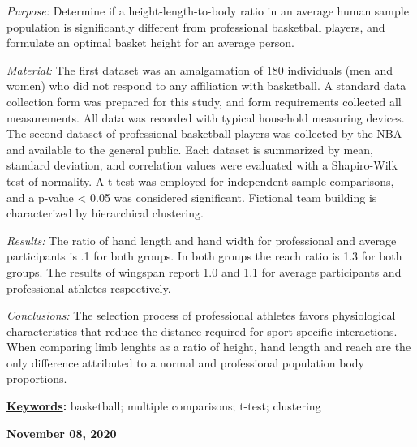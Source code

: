 \documentclass[]{article}
\renewenvironment{abstract}
 {{%
    \setlength{\leftmargin}{0mm}
    \setlength{\rightmargin}{\leftmargin}%
  }%
  \relax}
 {\endlist}
\begin{document}
\begin{abstract}

    \hbox{\vrule height .2pt width 39.14pc}

    \vskip 8.5pt %

\noindent \noindent \emph{Purpose:} Determine if a height-length-to-body ratio in
an average human sample population is significantly different from
professional basketball players, and formulate an optimal basket height
for an average person.\vspace{0.25in}

\noindent \emph{Material:} The first dataset was an amalgamation of 180
individuals (men and women) who did not respond to any affiliation with
basketball. A standard data collection form was prepared for this study,
and form requirements collected all measurements. All data was recorded
with typical household measuring devices. The second dataset of
professional basketball players was collected by the NBA and available
to the general public. Each dataset is summarized by mean, standard
deviation, and correlation values were evaluated with a Shapiro-Wilk
test of normality. A t-test was employed for independent sample
comparisons, and a p-value \textless{} 0.05 was considered significant.
Fictional team building is characterized by hierarchical clustering.
\vspace{0.25in}

\noindent \emph{Results:} The ratio of hand length and hand width for
professional and average participants is .1 for both groups. In both
groups the reach ratio is 1.3 for both groups. The results of wingspan
report 1.0 and 1.1 for average participants and professional athletes
respectively. \vspace{0.25in}

\noindent \emph{Conclusions:} The selection process of professional
athletes favors physiological characteristics that reduce the distance
required for sport specific interactions. When comparing limb lenghts as
a ratio of height, hand length and reach are the only difference
attributed to a normal and professional population body proportions.
\vspace{0.25in}


\vskip 8.5pt \noindent \textbf{\underline{Keywords}:} basketball; multiple comparisons; t-test; clustering \par

    




    
    \hbox{\vrule height .2pt width 39.14pc}
    \vskip 5pt 
    \hfill \textbf{\textcolor{WSU.gray}{ November 08, 2020 } }
    \vskip 5pt 
    
\end{abstract}
\end{document}
